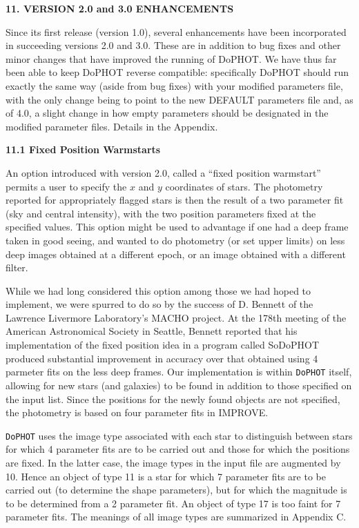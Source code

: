

\centerline {\bf 11. VERSION 2.0 and 3.0 ENHANCEMENTS}

Since its first release (version 1.0), several enhancements have been 
incorporated in succeeding versions 2.0 and 3.0. These are in addition to 
bug fixes and other minor changes that have improved the running of DoPHOT.
We have thus far been able to keep DoPHOT reverse compatible: specifically 
DoPHOT should run exactly the same way (aside from bug fixes) with your 
modified parameters file, with the only change being to point to the new
DEFAULT parameters file and, as of 4.0, a slight change in how empty 
parameters should be designated in the modified parameter files.  
Details in the Appendix.

\centerline {\bf 11.1 Fixed Position Warmstarts}

An option introduced with version 2.0, called a ``fixed
position warmstart'' permits a user to specify the $x$ and $y$
coordinates of stars.  The photometry reported for
appropriately flagged stars is then the result of a two
parameter fit (sky and central intensity), with the two
position parameters fixed at the specified values.
This option might be used to advantage if one had a deep
frame taken in good seeing, and wanted to do photometry (or
set upper limits) on less deep images obtained at a
different epoch, or an image obtained with a different
filter.

While we had long considered this option among those we had
hoped to implement, we were spurred to do so by the success
of D. Bennett of the Lawrence Livermore Laboratory's MACHO
project.  At the 178th meeting of the American Astronomical
Society in Seattle,  Bennett reported that his implementation of the
fixed position idea in a program called SoDoPHOT produced
substantial improvement in accuracy over that obtained
using 4 parmeter fits on the less deep frames.  Our
implementation is within {\tt DoPHOT} itself, allowing for new
stars (and galaxies) to be found in addition to those
specified on the input list.  Since the positions for the newly found
objects are not specified, the photometry is based on four parameter fits
in IMPROVE.

{\tt DoPHOT} uses the image type associated with each star to
distinguish between stars for which 4 parameter fits are to
be carried out and those for which the positions are fixed.
In the latter case, the image types in the input file are
augmented by 10.  Hence an object of type 11 is a star for
which 7 parameter fits are to be carried out (to determine
the shape parameters), but for which the magnitude is to be
determined from a 2 parameter fit.  An object of type 17 is
too faint for 7 parameter fits.  The meanings of all image types are
summarized in Appendix C.

